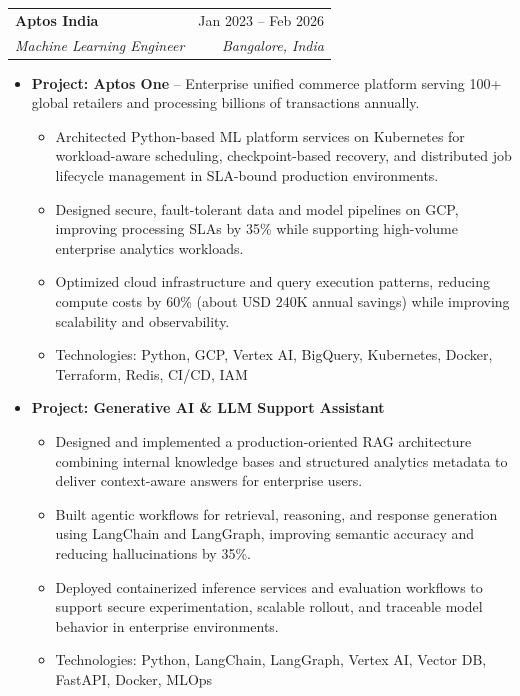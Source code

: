 \documentclass[letterpaper,10pt]{article}
\makeatletter
\newcommand{\resumeItem}[1]{\item\small{#1}}
\newcommand{\resumeSubheading}[4]{
\vspace{-1pt}\item
  \begin{tabular*}{0.97\textwidth}[t]{l@{\extracolsep{\fill}}r}
    \textbf{#1} & #2 \\
    \textit{#3} & \textit{#4} \\
  \end{tabular*}\vspace{-7pt}
}
\newcommand{\resumeSubHeadingList}{\begin{itemize}[leftmargin=0.15in, label={}]}
\newcommand{\resumeSubHeadingListEnd}{\end{itemize}}
\makeatother
\begin{document}
  \resumeSubheading
      {Aptos India}{Jan 2023 -- Feb 2026}
      {Machine Learning Engineer}{Bangalore, India}
      \resumeSubHeadingList
          \resumeItem{\textbf{Project: Aptos One} -- Enterprise unified commerce platform serving 100+ global retailers and processing billions of transactions annually.}
          \begin{itemize}[leftmargin=1.4em,label=•]
              \item \small{Architected Python-based ML platform services on Kubernetes for workload-aware scheduling, checkpoint-based recovery, and distributed job lifecycle management in SLA-bound production environments.}
              \item \small{Designed secure, fault-tolerant data and model pipelines on GCP, improving processing SLAs by 35\% while supporting high-volume enterprise analytics workloads.}
              \item \small{Optimized cloud infrastructure and query execution patterns, reducing compute costs by 60\% (about USD 240K annual savings) while improving scalability and observability.}
              \item \small{Technologies: Python, GCP, Vertex AI, BigQuery, Kubernetes, Docker, Terraform, Redis, CI/CD, IAM}
          \end{itemize}
          \resumeItem{\textbf{Project: Generative AI \& LLM Support Assistant}}
          \begin{itemize}[leftmargin=1.4em,label=•]
              \item \small{Designed and implemented a production-oriented RAG architecture combining internal knowledge bases and structured analytics metadata to deliver context-aware answers for enterprise users.}
              \item \small{Built agentic workflows for retrieval, reasoning, and response generation using LangChain and LangGraph, improving semantic accuracy and reducing hallucinations by 35\%.}
              \item \small{Deployed containerized inference services and evaluation workflows to support secure experimentation, scalable rollout, and traceable model behavior in enterprise environments.}
              \item \small{Technologies: Python, LangChain, LangGraph, Vertex AI, Vector DB, FastAPI, Docker, MLOps}
          \end{itemize}
      \resumeSubHeadingListEnd
\end{document}
